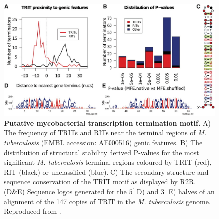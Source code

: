 \begin{figure}[htp]
\begin{center}
\includegraphics[width=14cm]{myco.jpg}
\caption[Putative mycobacterial transcription termination motif]{\textbf{Putative mycobacterial transcription termination motif.} A) The frequency of TRITs and RITs near the terminal regions of {\it M. tuberculosis} (EMBL accession: AE000516) genic features. B) The distribution of structural stability derived P-values for the most significant {\it M. tuberculosis} terminal regions coloured by TRIT (red), RIT (black) or unclassified (blue). C) The secondary structure and sequence conservation of the TRIT motif as displayed by R2R. (D\&E) Sequence logos generated for the $5^\prime$ D) and $3^\prime$ E) halves of an alignment of the 147 copies of TRIT in the {\it M. tuberculosis} genome. Reproduced from \textcite{Gardner2011a}.
} 
\label{fig:myco}
\end{center}
\end{figure}
